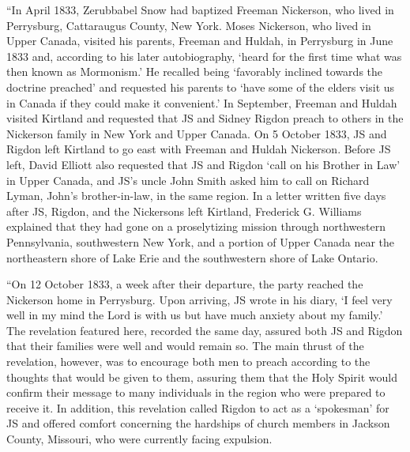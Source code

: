 			``In April 1833, Zerubbabel Snow had baptized Freeman Nickerson, who lived in Perrysburg, Cattaraugus County, New York. Moses Nickerson, who lived in Upper Canada, visited his parents, Freeman and Huldah, in Perrysburg in June 1833 and, according to his later autobiography, `heard for the first time what was then known as Mormonism.' He recalled being `favorably inclined towards the doctrine preached' and requested his parents to `have some of the elders visit us in Canada if they could make it convenient.' In September, Freeman and Huldah visited Kirtland and requested that JS and Sidney Rigdon preach to others in the Nickerson family in New York and Upper Canada. On 5 October 1833, JS and Rigdon left Kirtland to go east with Freeman and Huldah Nickerson. Before JS left, David Elliott also requested that JS and Rigdon `call on his Brother in Law' in Upper Canada, and JS's uncle John Smith asked him to call on Richard Lyman, John's brother-in-law, in the same region. In a letter written five days after JS, Rigdon, and the Nickersons left Kirtland, Frederick G. Williams explained that they had gone on a proselytizing mission through northwestern Pennsylvania, southwestern New York, and a portion of Upper Canada near the northeastern shore of Lake Erie and the southwestern shore of Lake Ontario.
			
			``On 12 October 1833, a week after their departure, the party reached the Nickerson home in Perrysburg. Upon arriving, JS wrote in his diary, `I feel very well in my mind the Lord is with us but have much anxiety about my family.' The revelation featured here, recorded the same day, assured both JS and Rigdon that their families were well and would remain so. The main thrust of the revelation, however, was to encourage both men to preach according to the thoughts that would be given to them, assuring them that the Holy Spirit would confirm their message to many individuals in the region who were prepared to receive it. In addition, this revelation called Rigdon to act as a `spokesman' for JS and offered comfort concerning the hardships of church members in Jackson County, Missouri, who were currently facing expulsion.
			
